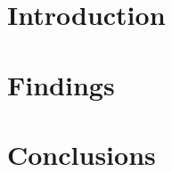\documentclass[12pt,dvips]{article}
\title{}
\author{}
\date{}
\begin{document}
\maketitle

\begin{abstract}
\end{abstract}

\section{Introduction}
\section{Findings}
\section{Conclusions}
\end{document}
